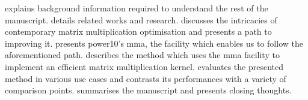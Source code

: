 \documentclass[\main/thesis.tex]{subfiles}
\begin{document}
 explains background information required to understand the rest of the manuscript.
 details related works and research.
 discusses the intricacies of contemporary matrix multiplication optimisation and presents a path to improving it.
 presents \gls{power10}'s \gls{mma}, the facility which enables us to follow the aforementioned path.
 describes the method which uses the \gls{mma} facility to implement an efficient matrix multiplication kernel.
 evaluates the presented method in various use cases and contrasts its performances with a variety of comparison points.
 summarises the manuscript and presents closing thoughts.

\end{document}
